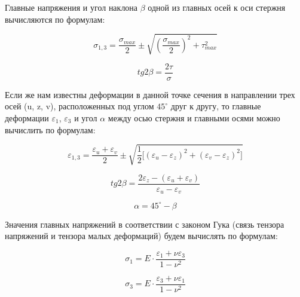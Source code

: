\documentclass[12pt, a4paper]{article}
\begin{document}
    Главные напряжения и угол наклона $\beta$ одной из главных осей к оси стержня вычисляются по формулам:
    
    \begin{equation}
        \sigma_{1,3} = \frac{\sigma_{max}}{2} \pm \sqrt{\left(\frac{\sigma_{max}}{2}\right)^{2} + \tau_{max}^{2}}
        \label{eq3}
    \end{equation}
    
    \begin{equation}
        tg2\beta = \frac{2\tau}{\sigma}
        \label{eq4}
    \end{equation}
    
    Если же нам известны деформации в данной точке сечения в направлении трех осей (u, z, v), расположенных под углом $45^{\circ}$ друг к другу, то главные деформации $\varepsilon_{1}$, $\varepsilon_{3}$ и угол $\alpha$ между осью стержня и главными осями можно вычислить по формулам:
    
    \begin{equation}
        \varepsilon_{1,3} = \frac{\varepsilon_{u} + \varepsilon_{v}}{2} \pm \sqrt{\frac{1}{2} \Big[ (\varepsilon_{u} - \varepsilon_{z})^{2} + (\varepsilon_{v} - \varepsilon_{z})^{2} \Big]}
        \label{eq5}
    \end{equation}
    
    \begin{equation}
        tg2\beta = \frac{2\varepsilon_{z} - (\varepsilon_{u} + \varepsilon_{v})}{\varepsilon_{u} - \varepsilon_{v}}
        \label{eq6}
    \end{equation}
    
    \begin{equation}
        \alpha = 45^{\circ} - \beta
        \label{eq7}
    \end{equation}
    
    Значения главных напряжений в соответствии с законом Гука (связь тензора напряжений и тензора малых деформаций) будем вычислять по формулам:
    
    \begin{equation}
        \sigma_{1} = E \cdot \frac{\varepsilon_{1} + \nu \varepsilon_{3}}{1 - \nu^{2}}
        \label{eq8}
    \end{equation}
    
    \begin{equation}
        \sigma_{3} = E \cdot \frac{\varepsilon_{3} + \nu \varepsilon_{1}}{1 - \nu^{2}}
        \label{eq9}
    \end{equation}
    
\end{document}
